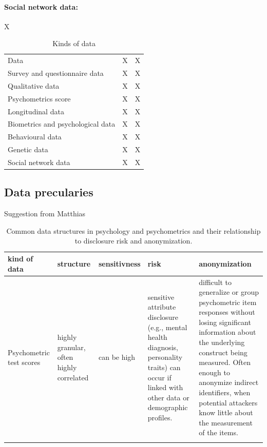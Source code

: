 \documentclass{article}
\begin{document}
\paragraph{Social network data:}
X

\begin{table}[H]
    \centering
    \begin{tabular}{lcc}
        Data & X & X \\
        Survey and questionnaire data & X & X \\
        Qualitative data & X & X \\
        Psychometrics score & X & X \\
        Longitudinal data & X & X \\
        Biometrics and psychological data & X & X \\
        Behavioural data & X & X \\
        Genetic data & X & X \\
        Social network data & X & X \\
    \end{tabular}
    \caption{Kinds of data}
    \label{tab:tab2}
\end{table}

\subsection{Data precularies}

\color{blue} 
Suggestion from Matthias
\color{black}

\begin{table}[H]
\begin{small}

    \centering
    \begin{tabular}{p{2cm}|p{2cm}|p{2cm}|p{3cm}|p{5cm}|}
    \toprule
       kind of data  & structure  & sensitivness & risk & anonymization \\
       \midrule
       Psychometric test scores   & highly granular, often highly correlated & can be high & sensitive attribute disclosure (e.g., mental health diagnosis, personality traits) can occur if linked with other data or demographic profiles. & difficult to generalize or group psychometric item responses without losing significant information about the underlying construct being measured. Often enough to anonymize indirect identifiers, when potential attackers know little about the measurement of the items. \\
       \midrule
       &&&& \\
       \bottomrule
    \end{tabular}
    \caption{Common data structures in psychology and psychometrics and their relationship to disclosure risk and anonymization.}
    \label{tab:my_label}

\end{small}
\end{table}
\end{document}
